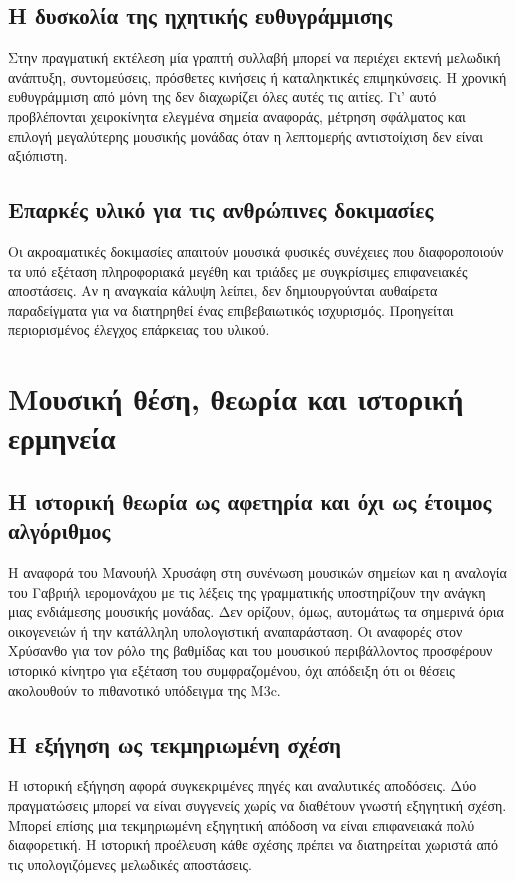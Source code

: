 \documentclass[11pt,a4paper]{extarticle}
\begin{document}
\subsection*{Η δυσκολία της ηχητικής ευθυγράμμισης}
Στην πραγματική εκτέλεση μία γραπτή συλλαβή μπορεί να περιέχει εκτενή μελωδική ανάπτυξη, συντομεύσεις, πρόσθετες κινήσεις ή καταληκτικές επιμηκύνσεις. Η χρονική ευθυγράμμιση από μόνη της δεν διαχωρίζει όλες αυτές τις αιτίες. Γι' αυτό προβλέπονται χειροκίνητα ελεγμένα σημεία αναφοράς, μέτρηση σφάλματος και επιλογή μεγαλύτερης μουσικής μονάδας όταν η λεπτομερής αντιστοίχιση δεν είναι αξιόπιστη.

\subsection*{Επαρκές υλικό για τις ανθρώπινες δοκιμασίες}
Οι ακροαματικές δοκιμασίες απαιτούν μουσικά φυσικές συνέχειες που διαφοροποιούν τα υπό εξέταση πληροφοριακά μεγέθη και τριάδες με συγκρίσιμες επιφανειακές αποστάσεις. Αν η αναγκαία κάλυψη λείπει, δεν δημιουργούνται αυθαίρετα παραδείγματα για να διατηρηθεί ένας επιβεβαιωτικός ισχυρισμός. Προηγείται περιορισμένος έλεγχος επάρκειας του υλικού.

\section{Μουσική θέση, θεωρία και ιστορική ερμηνεία}

\subsection*{Η ιστορική θεωρία ως αφετηρία και όχι ως έτοιμος αλγόριθμος}
Η αναφορά του Μανουήλ Χρυσάφη στη συνένωση μουσικών σημείων και η αναλογία του Γαβριήλ ιερομονάχου με τις λέξεις της γραμματικής υποστηρίζουν την ανάγκη μιας ενδιάμεσης μουσικής μονάδας. Δεν ορίζουν, όμως, αυτομάτως τα σημερινά όρια οικογενειών ή την κατάλληλη υπολογιστική αναπαράσταση. Οι αναφορές στον Χρύσανθο για τον ρόλο της βαθμίδας και του μουσικού περιβάλλοντος προσφέρουν ιστορικό κίνητρο για εξέταση του συμφραζομένου, όχι απόδειξη ότι οι θέσεις ακολουθούν το πιθανοτικό υπόδειγμα της M3c.

\subsection*{Η εξήγηση ως τεκμηριωμένη σχέση}
Η ιστορική εξήγηση αφορά συγκεκριμένες πηγές και αναλυτικές αποδόσεις. Δύο πραγματώσεις μπορεί να είναι συγγενείς χωρίς να διαθέτουν γνωστή εξηγητική σχέση. Μπορεί επίσης μια τεκμηριωμένη εξηγητική απόδοση να είναι επιφανειακά πολύ διαφορετική. Η ιστορική προέλευση κάθε σχέσης πρέπει να διατηρείται χωριστά από τις υπολογιζόμενες μελωδικές αποστάσεις.
\end{document}
